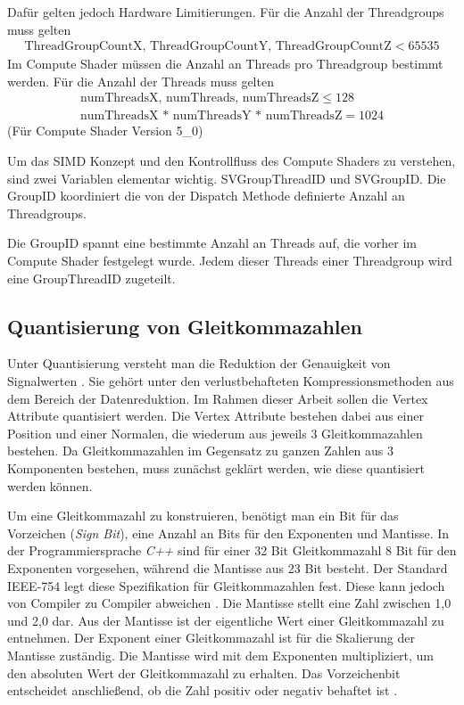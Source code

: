 Dafür gelten jedoch Hardware Limitierungen.
Für die Anzahl der Threadgroups muss gelten
\begin{gather*}
	\text{ThreadGroupCountX, ThreadGroupCountY, ThreadGroupCountZ} < 65535
\end{gather*}
Im Compute Shader müssen die Anzahl an Threads pro Threadgroup bestimmt werden.
Für die Anzahl der Threads muss gelten
\begin{gather*}
	\text{numThreadsX, numThreads, numThreadsZ} \leq 128 \\
	\text{numThreadsX * numThreadsY * numThreadsZ} = 1024
\end{gather*}
(Für Compute Shader Version 5\_0)

Um das SIMD Konzept und den Kontrollfluss des Compute Shaders zu verstehen, sind zwei Variablen elementar wichtig.
SVGroupThreadID und SVGroupID.
Die GroupID koordiniert die von der Dispatch Methode definierte Anzahl an Threadgroups.

Die GroupID spannt eine bestimmte Anzahl an Threads auf, die vorher im Compute Shader festgelegt wurde.
Jedem dieser Threads einer Threadgroup wird eine GroupThreadID zugeteilt.

\subsection{Quantisierung von Gleitkommazahlen}
\label{subsec:quantisierung}
Unter Quantisierung versteht man die Reduktion der Genauigkeit von Signalwerten \cite{Strutz2009}.
Sie gehört unter den verlustbehafteten Kompressionsmethoden aus dem Bereich der Datenreduktion.
Im Rahmen dieser Arbeit sollen die Vertex Attribute quantisiert werden.
Die Vertex Attribute bestehen dabei aus einer Position und einer Normalen, die wiederum aus jeweils 3 Gleitkommazahlen bestehen.
Da Gleitkommazahlen im Gegensatz zu ganzen Zahlen aus 3 Komponenten bestehen, muss zunächst geklärt werden, wie diese quantisiert werden können. \newline

Um eine Gleitkommazahl zu konstruieren, benötigt man ein Bit für das Vorzeichen (\textit{Sign Bit}), eine Anzahl an Bits für den Exponenten und Mantisse.
In der Programmiersprache \textit{C++} sind für einer 32 Bit Gleitkommazahl 8 Bit für den Exponenten vorgesehen, während die Mantisse aus 23 Bit besteht.
Der Standard IEEE-754 legt diese Spezifikation für Gleitkommazahlen fest.
Diese kann jedoch von Compiler zu Compiler abweichen \cite{Microsoft2023}.
Die Mantisse stellt eine Zahl zwischen 1,0 und 2,0 dar.
Aus der Mantisse ist der eigentliche Wert einer Gleitkommazahl zu entnehmen.
Der Exponent einer Gleitkommazahl ist für die Skalierung der Mantisse zuständig.
Die Mantisse wird mit dem Exponenten multipliziert, um den absoluten Wert der Gleitkommazahl zu erhalten.
Das Vorzeichenbit entscheidet anschließend, ob die Zahl positiv oder negativ behaftet ist \cite{Widrow_Kollár_2008}. \newline

